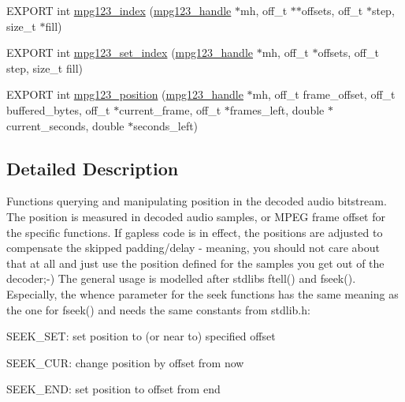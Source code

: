 \begin{DoxyCompactItemize}
E\+X\+P\+O\+RT int \hyperlink{group__mpg123__seek_ga86508f957e5ebdf27e665f2ce0b8ff2a}{mpg123\+\_\+index} (\hyperlink{group__mpg123__init_ga6728e2839a395f3a07d4514da659faca}{mpg123\+\_\+handle} $\ast$mh, off\+\_\+t $\ast$$\ast$offsets, off\+\_\+t $\ast$step, size\+\_\+t $\ast$fill)
\item 
E\+X\+P\+O\+RT int \hyperlink{group__mpg123__seek_ga176cdb470902ebbc4839c99d7e20791e}{mpg123\+\_\+set\+\_\+index} (\hyperlink{group__mpg123__init_ga6728e2839a395f3a07d4514da659faca}{mpg123\+\_\+handle} $\ast$mh, off\+\_\+t $\ast$offsets, off\+\_\+t step, size\+\_\+t fill)
\item 
E\+X\+P\+O\+RT int \hyperlink{group__mpg123__seek_ga3ae552c9fe5b27ec5562c444bacba5fe}{mpg123\+\_\+position} (\hyperlink{group__mpg123__init_ga6728e2839a395f3a07d4514da659faca}{mpg123\+\_\+handle} $\ast$mh, off\+\_\+t frame\+\_\+offset, off\+\_\+t buffered\+\_\+bytes, off\+\_\+t $\ast$current\+\_\+frame, off\+\_\+t $\ast$frames\+\_\+left, double $\ast$current\+\_\+seconds, double $\ast$seconds\+\_\+left)
\end{DoxyCompactItemize}


\subsection{Detailed Description}
Functions querying and manipulating position in the decoded audio bitstream. The position is measured in decoded audio samples, or M\+P\+EG frame offset for the specific functions. If gapless code is in effect, the positions are adjusted to compensate the skipped padding/delay -\/ meaning, you should not care about that at all and just use the position defined for the samples you get out of the decoder;-\/) The general usage is modelled after stdlib\textquotesingle{}s ftell() and fseek(). Especially, the whence parameter for the seek functions has the same meaning as the one for fseek() and needs the same constants from stdlib.\+h\+:
\begin{DoxyItemize}
\item S\+E\+E\+K\+\_\+\+S\+ET\+: set position to (or near to) specified offset
\item S\+E\+E\+K\+\_\+\+C\+UR\+: change position by offset from now
\item S\+E\+E\+K\+\_\+\+E\+ND\+: set position to offset from end
\end{DoxyItemize}

